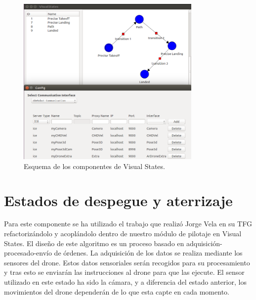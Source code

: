 
\begin{figure}[H]
	\begin{center}
		\includegraphics[width=0.8\textwidth]{imag/IMG32.png}
				\caption{Esquema de los componentes de Visual States.}
		\label{fig:Esquema VisualStates.}	
	\end{center}
\end{figure}

\section{Estados de despegue y aterrizaje}
\hspace{1cm} Para este componente se ha utilizado el trabajo que realizó Jorge Vela en su TFG \cite{JorgeVela} refactorizándolo y acoplándolo dentro de nuestro módulo de pilotaje en Visual States. El diseño de este algoritmo es un proceso basado en adquisición-procesado-envío de órdenes.  La adquisición de los datos se realiza mediante los sensores del drone. Estos datos sensoriales serán recogidos para su procesamiento y tras esto se enviarán las instrucciones al drone para que las ejecute. El sensor utilizado en este estado ha sido la cámara, y a diferencia del estado anterior, los movimientos del drone dependerán de lo que esta capte en cada momento.

